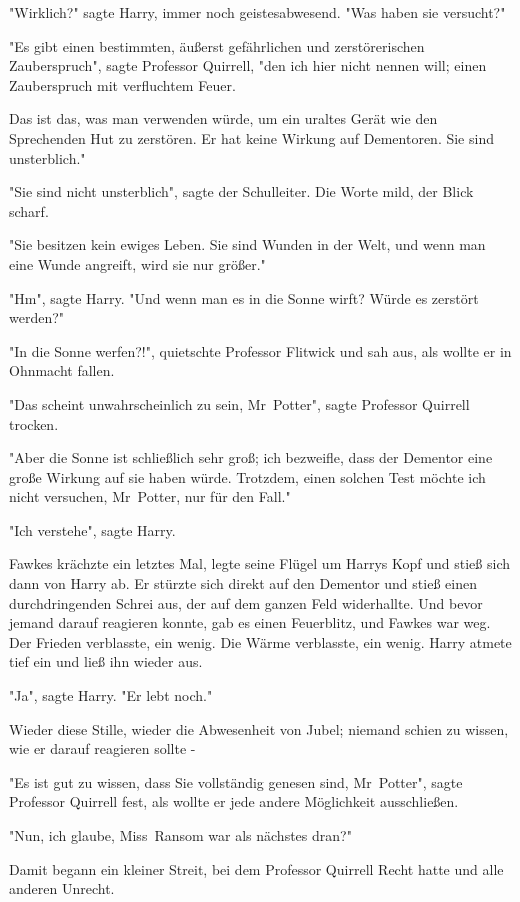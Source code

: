 {"Wirklich?" sagte Harry, immer noch geistesabwesend. "Was haben sie versucht?"

"Es gibt einen bestimmten, äußerst gefährlichen und zerstörerischen Zauberspruch", sagte Professor Quirrell, "den ich hier nicht nennen will; einen Zauberspruch mit verfluchtem Feuer.

Das ist das, was man verwenden würde, um ein uraltes Gerät wie den Sprechenden Hut zu zerstören. Er hat keine Wirkung auf Dementoren. Sie sind unsterblich."

"Sie sind nicht unsterblich", sagte der Schulleiter. Die Worte mild, der Blick scharf.

"Sie besitzen kein ewiges Leben. Sie sind Wunden in der Welt, und wenn man eine Wunde angreift, wird sie nur größer."

"Hm", sagte Harry. "Und wenn man es in die Sonne wirft? Würde es zerstört werden?"

"In die Sonne werfen?!", quietschte Professor Flitwick und sah aus, als wollte er in Ohnmacht fallen.

"Das scheint unwahrscheinlich zu sein, Mr~Potter", sagte Professor Quirrell trocken.

"Aber die Sonne ist schließlich sehr groß; ich bezweifle, dass der Dementor eine große Wirkung auf sie haben würde. Trotzdem, einen solchen Test möchte ich nicht versuchen, Mr~Potter, nur für den Fall."

"Ich verstehe", sagte Harry.

Fawkes krächzte ein letztes Mal, legte seine Flügel um Harrys Kopf und stieß sich dann von Harry ab. Er stürzte sich direkt auf den Dementor und stieß einen durchdringenden Schrei aus, der auf dem ganzen Feld widerhallte. Und bevor jemand darauf reagieren konnte, gab es einen Feuerblitz, und Fawkes war weg. Der Frieden verblasste, ein wenig. Die Wärme verblasste, ein wenig. Harry atmete tief ein und ließ ihn wieder aus.

"Ja", sagte Harry. "Er lebt noch."

Wieder diese Stille, wieder die Abwesenheit von Jubel; niemand schien zu wissen, wie er darauf reagieren sollte -

"Es ist gut zu wissen, dass Sie vollständig genesen sind, Mr~Potter", sagte Professor Quirrell fest, als wollte er jede andere Möglichkeit ausschließen.

"Nun, ich glaube, Miss~Ransom war als nächstes dran?"

Damit begann ein kleiner Streit, bei dem Professor Quirrell Recht hatte und alle anderen Unrecht.

}
